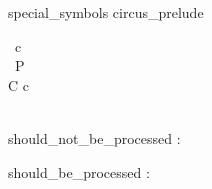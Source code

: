 \documentclass{article}
\begin{document}
\begin{zsection}
   \SECTION special\_symbols \parents circus\_prelude
\end{zsection}

\begin{circus}
   \circchannel\ c \\
    \circprocess\ P \circdef \circbegin \\
       C \circdef c \then \Skip \\
       \znewpage
    \circspot \Skip \\
    \zbreak
    \circend
\end{circus}

\circtoolsoff

\begin{circus}
   \circchannel should\_not\_be\_processed : \nat
\end{circus}

\circtoolson

\begin{circus}
   \circchannel should\_be\_processed : \nat
\end{circus}
\end{document}
